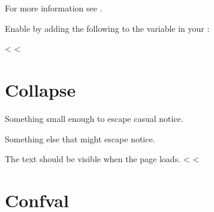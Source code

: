 \documentclass[letterpaper,10pt,english]{sphinxmanual}
\begin{document}
\label{\detokenize{installation:extensions-4}}

\begin{sphinxVerbatim}[commandchars=\\\{\}]
  \PYG{p}{[}
    \PYG{p}{]}
\end{sphinxVerbatim}
\begin{flushleft}
For more information see  .
\end{flushleft}

\label{\detokenize{installation:extensions-5}}

\vspace{10px}

Enable  by adding the following
to the  variable in your :

\begin{sphinxVerbatim}[commandchars=\\\{\}]
  \PYG{p}{[}
    \PYG{p}{]}
\end{sphinxVerbatim}

<%
\sphinxstepscope
<%

\chapter{Collapse}
\label{\detokenize{collapse:collapse}}\label{\detokenize{collapse::doc}}
Something small enough to escape casual notice.

Something else that might escape notice.

The text should be visible when the page loads.
<%
\sphinxstepscope
<%

\chapter{Confval}
\label{\detokenize{confval:confval}}\label{\detokenize{confval::doc}}
\end{document}
